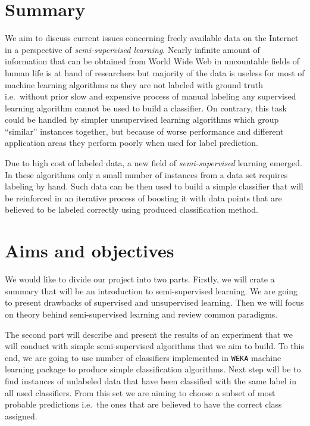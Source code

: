 \section*{Summary}
We aim to discuss current issues concerning freely available data on the Internet in a perspective of \emph{semi-supervised learning}. Nearly infinite amount of information that can be obtained from World Wide Web in uncountable fields of human life is at hand of researchers but majority of the data is useless for most of machine learning algorithms as they are not labeled with ground truth i.e.\ without prior slow and expensive process of manual labeling any supervised learning algorithm cannot be used to build a classifier. On contrary, this task could be handled by simpler unsupervised learning algorithms which group ``similar'' instances together, but because of worse performance and different application areas they perform poorly when used for label prediction.

Due to high cost of labeled data, a new field of \emph{semi-supervised} learning emerged. In these algorithms only a small number of instances from a data set requires labeling by hand. Such data can be then used to build a simple classifier that will be reinforced in an iterative process of boosting it with data points that are believed to be labeled correctly using produced classification method.

\section*{Aims and objectives}
We would like to divide our project into two parts. Firstly, we will crate a summary that will be an introduction to semi-supervised learning. We are going to present drawbacks of supervised and unsupervised learning. Then we will focus on theory behind semi-supervised learning and review common paradigms.

The second part will describe and present the results of an experiment that we will conduct with simple semi-supervised algorithms that we aim to build. To this end, we are going to use number of classifiers implemented in \texttt{WEKA} machine learning package to produce simple classification algorithms. Next step will be to find instances of unlabeled data that have been classified with the same label in all used classifiers. From this set we are aiming to choose a subset of most probable predictions i.e.\ the ones that are believed to have the correct class assigned.

